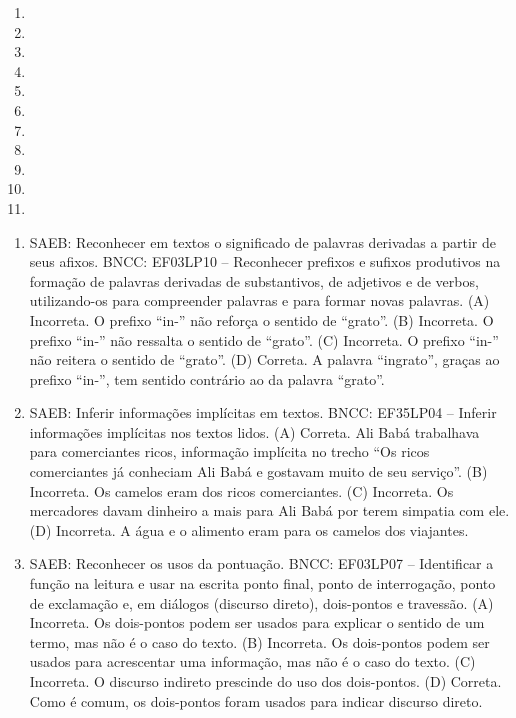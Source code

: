\begin{enumerate}
\item
\item
\item
\item
\item
\item
\item
\item
\item
\item
\item
\end{enumerate}


\begin{enumerate}
\item
SAEB: Reconhecer em textos o significado de palavras derivadas a partir de seus afixos.
BNCC: EF03LP10 -- Reconhecer prefixos e sufixos produtivos na formação de
palavras derivadas de substantivos, de adjetivos e de verbos,
utilizando-os para compreender palavras e para formar novas palavras.
(A) Incorreta. O prefixo ``in-'' não reforça o sentido de ``grato''.
(B) Incorreta. O prefixo ``in-'' não ressalta o sentido de ``grato''.
(C) Incorreta. O prefixo ``in-'' não reitera o sentido de ``grato''.
(D) Correta. A palavra ``ingrato'', graças ao prefixo ``in-'', tem sentido contrário ao da palavra ``grato''.

\item
SAEB: Inferir informações implícitas em textos.
BNCC: EF35LP04 -- Inferir informações implícitas nos textos lidos.
(A) Correta. Ali Babá trabalhava para comerciantes ricos, informação
implícita no trecho ``Os ricos comerciantes já conheciam Ali Babá e
gostavam muito de seu serviço''.
(B) Incorreta. Os camelos eram dos ricos comerciantes.
(C) Incorreta. Os mercadores davam dinheiro a mais para Ali Babá por
terem simpatia com ele.
(D) Incorreta. A água e o alimento eram para os camelos dos viajantes.

\item
SAEB: Reconhecer os usos da pontuação.
BNCC: EF03LP07 -- Identificar a função na leitura e usar na escrita ponto final, ponto
de interrogação, ponto de exclamação e, em diálogos (discurso direto), dois-pontos e
travessão.
(A) Incorreta. Os dois-pontos podem ser usados para explicar o sentido de um termo, mas não é o caso do texto.
(B) Incorreta. Os dois-pontos podem ser usados para acrescentar uma informação, mas não é o caso do texto.
(C) Incorreta. O discurso indireto prescinde do uso dos dois-pontos.
(D) Correta. Como é comum, os dois-pontos foram usados para indicar discurso direto.


\end{enumerate}

